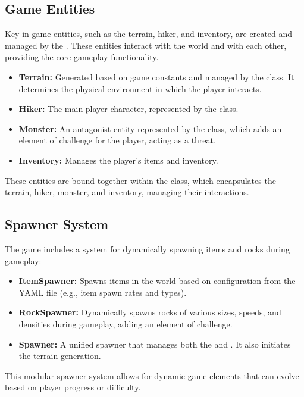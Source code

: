 \subsection{Game Entities}

Key in-game entities, such as the terrain, hiker, and inventory, are created and managed by the .
These entities interact with the world and with each other, providing the core gameplay functionality.

\begin{itemize}
    \item \textbf{Terrain:} Generated based on game constants and managed by the  class. It determines the physical environment in which the player interacts.
    \item \textbf{Hiker:} The main player character, represented by the  class.
    \item \textbf{Monster:} An antagonist entity represented by the  class, which adds an element of challenge for the player, acting as a threat.
    \item \textbf{Inventory:} Manages the player's items and inventory.
\end{itemize}

These entities are bound together within the  class, which encapsulates the terrain, hiker, monster, and inventory, managing their interactions.


\subsection{Spawner System}

The game includes a system for dynamically spawning items and rocks during gameplay:

\begin{itemize}
    \item \textbf{ItemSpawner:} Spawns items in the world based on configuration from the YAML file (e.g., item spawn rates and types).
    \item \textbf{RockSpawner:} Dynamically spawns rocks of various sizes, speeds, and densities during gameplay, adding an element of challenge.
    \item \textbf{Spawner:} A unified spawner that manages both the  and . It also initiates the terrain generation.
\end{itemize}

This modular spawner system allows for dynamic game elements that can evolve based on player progress or difficulty.
\pagebreak
